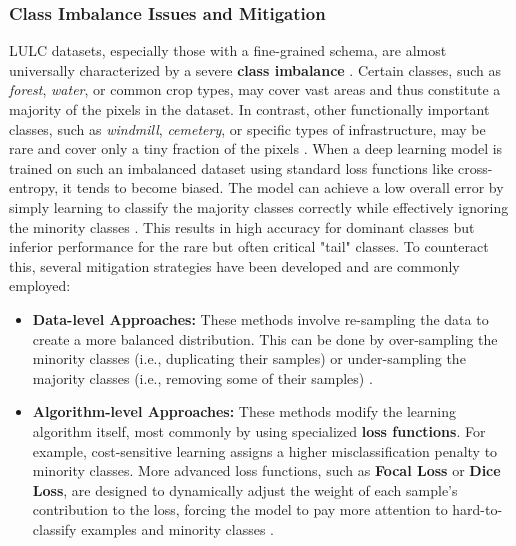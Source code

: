 \documentclass{report}
\begin{document}
\subsubsection{Class Imbalance Issues and Mitigation}
LULC datasets, especially those with a fine-grained schema, are almost universally characterized by a severe \textbf{class imbalance} \parencites[p.~3f.;]{QinLiuReviewLandcoverClassificationVeryHighResolutionRemotelySensedOpticalImagesAnalysisUnitModelScalabilityTransferability2022}[p.~5]{SertelEtAlLandUseLandCoverMappingUsingDeepLearningBasedSegmentationApproachesVHRWorldview3Images2022}. Certain classes, such as \textit{forest}, \textit{water}, or common crop types, may cover vast areas and thus constitute a majority of the pixels in the dataset. In contrast, other functionally important classes, such as \textit{windmill}, \textit{cemetery}, or specific types of infrastructure, may be rare and cover only a tiny fraction of the pixels \parencites[p.~7934]{BhatEtAlRobustlossfunctionclassimbalancedsemanticsegmentationimageclassification2023a}.
When a deep learning model is trained on such an imbalanced dataset using standard loss functions like cross-entropy, it tends to become biased. The model can achieve a low overall error by simply learning to classify the majority classes correctly while effectively ignoring the minority classes \parencites[p.~7934f.]{BhatEtAlRobustlossfunctionclassimbalancedsemanticsegmentationimageclassification2023a}. This results in high accuracy for dominant classes but inferior performance for the rare but often critical "tail" classes. To counteract this, several mitigation strategies have been developed and are commonly employed:
\begin{itemize}
    \item \textbf{Data-level Approaches:} These methods involve re-sampling the data to create a more balanced distribution. This can be done by over-sampling the minority classes (i.e., duplicating their samples) or under-sampling the majority classes (i.e., removing some of their samples) \parencites[p.~7934f.;]{BhatEtAlRobustlossfunctionclassimbalancedsemanticsegmentationimageclassification2023a}.
    \item \textbf{Algorithm-level Approaches:} These methods modify the learning algorithm itself, most commonly by using specialized \textbf{loss functions}. For example, cost-sensitive learning assigns a higher misclassification penalty to minority classes. More advanced loss functions, such as \textbf{Focal Loss} or \textbf{Dice Loss}, are designed to dynamically adjust the weight of each sample's contribution to the loss, forcing the model to pay more attention to hard-to-classify examples and minority classes \parencites[p.~7935;]{BhatEtAlRobustlossfunctionclassimbalancedsemanticsegmentationimageclassification2023a}[p.~8]{SertelEtAlLandUseLandCoverMappingUsingDeepLearningBasedSegmentationApproachesVHRWorldview3Images2022}.
\end{itemize}
\end{document}

